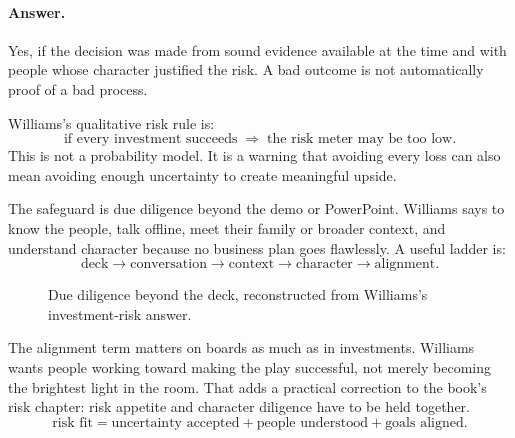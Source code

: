 \documentclass[11pt,oneside]{book}
\begin{document}
\paragraph{Answer.}
Yes, if the decision was made from sound evidence available at the time and with people whose character justified the risk. A bad outcome is not automatically proof of a bad process.

Williams's qualitative risk rule is:
\[
\text{if every investment succeeds}
\;\Longrightarrow\;
\text{the risk meter may be too low}.
\]
This is not a probability model. It is a warning that avoiding every loss can also mean avoiding enough uncertainty to create meaningful upside.

The safeguard is due diligence beyond the demo or PowerPoint. Williams says to know the people, talk offline, meet their family or broader context, and understand character because no business plan goes flawlessly. A useful ladder is:
\[
\text{deck}
\longrightarrow
\text{conversation}
\longrightarrow
\text{context}
\longrightarrow
\text{character}
\longrightarrow
\text{alignment}.
\]

\begin{figure}
\centering
{}
\caption{Due diligence beyond the deck, reconstructed from Williams's investment-risk answer.}
\end{figure}

The alignment term matters on boards as much as in investments. Williams wants people working toward making the play successful, not merely becoming the brightest light in the room. That adds a practical correction to the book's risk chapter: risk appetite and character diligence have to be held together.
\[
\text{risk fit}
=
\text{uncertainty accepted}
+
\text{people understood}
+
\text{goals aligned}.
\]
\end{document}

